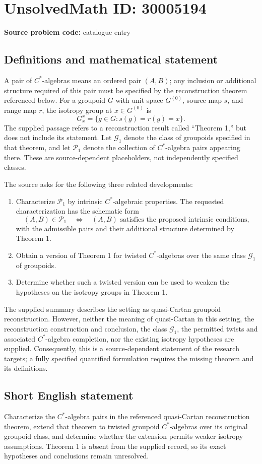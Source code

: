 \documentclass[11pt]{article}
\begin{document}
\section*{UnsolvedMath ID: 30005194}
\textbf{Source problem code:} catalogue entry
\subsection{Definitions and mathematical statement}
A pair of \(C^*\)-algebras means an ordered pair \((A,B)\); any inclusion or additional structure required of this pair must be specified by the reconstruction theorem referenced below. For a groupoid \(G\) with unit space \(G^{(0)}\), source map \(s\), and range map \(r\), the isotropy group at \(x\in G^{(0)}\) is
\[
G_x^x=\{g\in G:s(g)=r(g)=x\}.
\]
The supplied passage refers to a reconstruction result called ``Theorem 1,'' but does not include its statement. Let \(\mathcal G_1\) denote the class of groupoids specified in that theorem, and let \(\mathcal P_1\) denote the collection of \(C^*\)-algebra pairs appearing there. These are source-dependent placeholders, not independently specified classes.

The source asks for the following three related developments:
\begin{enumerate}
\item Characterize \(\mathcal P_1\) by intrinsic \(C^*\)-algebraic properties. The requested characterization has the schematic form
\[
(A,B)\in\mathcal P_1
\quad\Longleftrightarrow\quad
(A,B)\text{ satisfies the proposed intrinsic conditions},
\]
with the admissible pairs and their additional structure determined by Theorem 1.
\item Obtain a version of Theorem 1 for twisted \(C^*\)-algebras over the same class \(\mathcal G_1\) of groupoids.
\item Determine whether such a twisted version can be used to weaken the hypotheses on the isotropy groups in Theorem 1.
\end{enumerate}
The supplied summary describes the setting as quasi-Cartan groupoid reconstruction. However, neither the meaning of quasi-Cartan in this setting, the reconstruction construction and conclusion, the class \(\mathcal G_1\), the permitted twists and associated \(C^*\)-algebra completion, nor the existing isotropy hypotheses are supplied. Consequently, this is a source-dependent statement of the research targets; a fully specified quantified formulation requires the missing theorem and its definitions.
\subsection{Short English statement}
Characterize the \(C^*\)-algebra pairs in the referenced quasi-Cartan reconstruction theorem, extend that theorem to twisted groupoid \(C^*\)-algebras over its original groupoid class, and determine whether the extension permits weaker isotropy assumptions. Theorem 1 is absent from the supplied record, so its exact hypotheses and conclusions remain unresolved.
\end{document}
